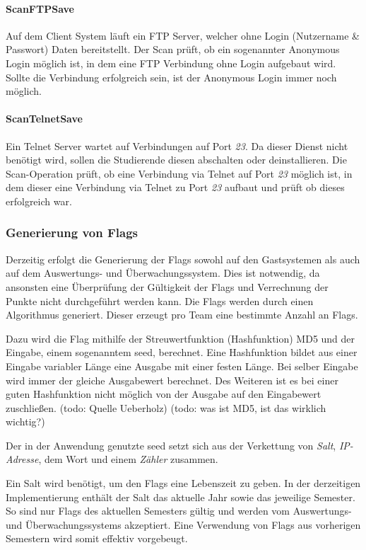 \paragraph{ScanFTPSave}\label{para:ScanFTPSave}
Auf dem Client System läuft ein FTP Server, welcher ohne Login (Nutzername \& Passwort) Daten bereitstellt. Der Scan prüft, ob ein sogenannter Anonymous Login möglich ist, in dem eine FTP Verbindung ohne Login aufgebaut wird. Sollte die Verbindung erfolgreich sein, ist der Anonymous Login immer noch möglich.

\paragraph{ScanTelnetSave}\label{para:ScanTelnetSave}
Ein Telnet Server wartet auf Verbindungen auf Port \textit{23}. Da dieser Dienst nicht benötigt wird, sollen die Studierende diesen abschalten oder deinstallieren. Die Scan-Operation prüft, ob eine Verbindung via Telnet auf Port \textit{23} möglich ist, in dem dieser eine Verbindung via Telnet zu Port \textit{23} aufbaut und prüft ob dieses erfolgreich war.

\subsubsection{Generierung von Flags}\label{subsubsec:Generierung_von_Flags}

Derzeitig erfolgt die Generierung der Flags sowohl auf den Gastsystemen als auch auf dem Auswertungs- und Überwachungssystem. Dies ist notwendig, da ansonsten eine Überprüfung der Gültigkeit der Flags und Verrechnung der Punkte nicht durchgeführt werden kann. Die Flags werden durch einen Algorithmus generiert. Dieser erzeugt pro Team eine bestimmte Anzahl an Flags. 

Dazu wird die Flag mithilfe der Streuwertfunktion (Hashfunktion) MD5 und der Eingabe, einem sogenanntem seed, berechnet. Eine Hashfunktion bildet aus einer Eingabe variabler Länge eine Ausgabe mit einer festen Länge. Bei selber Eingabe wird immer der gleiche Ausgabewert berechnet. Des Weiteren ist es bei einer guten Hashfunktion nicht möglich von der Ausgabe auf den Eingabewert zuschließen.
(todo: Quelle Ueberholz)
(todo: was ist MD5, ist das wirklich wichtig?)

Der in der Anwendung genutzte seed setzt sich aus der Verkettung von \textit{Salt}, \textit{IP-Adresse}, dem Wort  und einem \textit{Zähler} zusammen.

Ein Salt wird benötigt, um den Flags eine Lebenszeit zu geben. In der derzeitigen Implementierung enthält der Salt das aktuelle Jahr sowie das jeweilige Semester. So sind nur Flags des aktuellen Semesters gültig und werden vom Auswertungs- und Überwachungssystems akzeptiert. Eine Verwendung von Flags aus vorherigen Semestern wird somit effektiv vorgebeugt.

